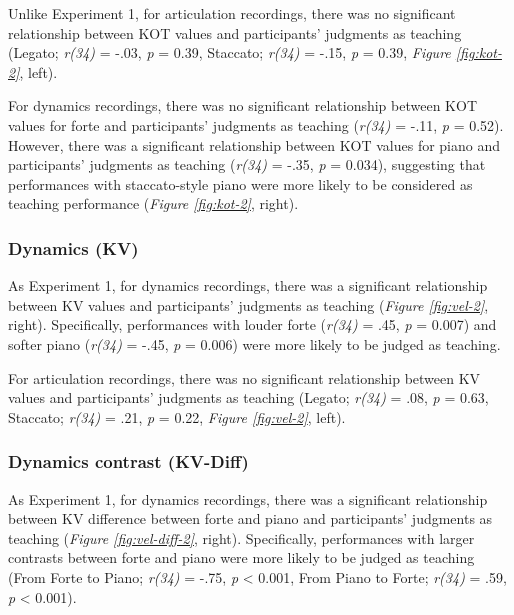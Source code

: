 \documentclass[
  man,floatsintext]{apa6}
\begin{document}
Unlike Experiment 1, for articulation recordings, there was no significant relationship between KOT values and participants' judgments as teaching (Legato; \emph{r(34)} = -.03, \emph{p} = 0.39, Staccato; \emph{r(34)} = -.15, \emph{p} = 0.39, \emph{Figure \ref{fig:kot-2}}, left).

For dynamics recordings, there was no significant relationship between KOT values for forte and participants' judgments as teaching (\emph{r(34)} = -.11, \emph{p} = 0.52). However, there was a significant relationship between KOT values for piano and participants' judgments as teaching (\emph{r(34)} = -.35, \emph{p} = 0.034), suggesting that performances with staccato-style piano were more likely to be considered as teaching performance (\emph{Figure \ref{fig:kot-2}}, right).

\hypertarget{dynamics-kv-1}{%
\subsubsection{Dynamics (KV)}\label{dynamics-kv-1}}

As Experiment 1, for dynamics recordings, there was a significant relationship between KV values and participants' judgments as teaching (\emph{Figure \ref{fig:vel-2}}, right). Specifically, performances with louder forte (\emph{r(34)} = .45, \emph{p} = 0.007) and softer piano (\emph{r(34)} = -.45, \emph{p} = 0.006) were more likely to be judged as teaching.

For articulation recordings, there was no significant relationship between KV values and participants' judgments as teaching (Legato; \emph{r(34)} = .08, \emph{p} = 0.63, Staccato; \emph{r(34)} = .21, \emph{p} = 0.22, \emph{Figure \ref{fig:vel-2}}, left).

\hypertarget{dynamics-contrast-kv-diff-1}{%
\subsubsection{Dynamics contrast (KV-Diff)}\label{dynamics-contrast-kv-diff-1}}

As Experiment 1, for dynamics recordings, there was a significant relationship between KV difference between forte and piano and participants' judgments as teaching (\emph{Figure \ref{fig:vel-diff-2}}, right). Specifically, performances with larger contrasts between forte and piano were more likely to be judged as teaching (From Forte to Piano; \emph{r(34)} = -.75, \emph{p} \textless{} 0.001, From Piano to Forte; \emph{r(34)} = .59, \emph{p} \textless{} 0.001).
\end{document}
